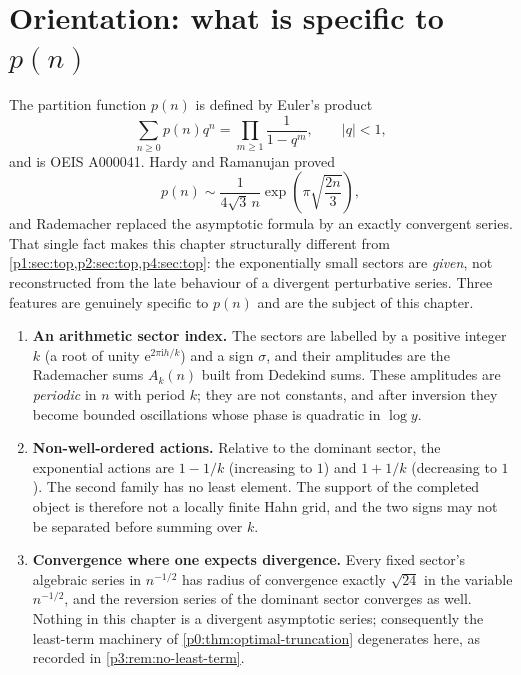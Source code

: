 \documentclass[11pt,a4paper,oneside]{book}
\theoremstyle{plain}
\theoremstyle{definition}
\theoremstyle{remark}
\newcommand{\e}{\mathrm{e}}
\newcommand{\ii}{\mathrm{i}}
\begin{document}
\section{Orientation: what is specific to \texorpdfstring{$p(n)$}{p(n)}}
\label{p3:sec:orientation}

The partition function $p(n)$ is defined by Euler's product
\begin{equation}\label{p3:eq:euler-product}
 \sum_{n\ge0}p(n)q^{n}=\prod_{m\ge1}\frac1{1-q^{m}},\qquad |q|<1 ,
\end{equation}
and is OEIS A000041. Hardy and Ramanujan proved
\begin{equation}\label{p3:eq:HR}
 p(n)\sim\frac1{4\sqrt3\,n}\exp\!\left(\pi\sqrt{\frac{2n}{3}}\right),
\end{equation}
and Rademacher replaced the asymptotic formula by an exactly convergent series. That single fact
makes this chapter structurally different from \cref{p1:sec:top,p2:sec:top,p4:sec:top}: the
exponentially small sectors are \emph{given}, not reconstructed from the late behaviour of a
divergent perturbative series. Three features are genuinely specific to $p(n)$ and are the subject
of this chapter.

\begin{enumerate}
\item \textbf{An arithmetic sector index.}  The sectors are labelled by a
positive integer $k$ (a root of unity $\e^{2\pi\ii h/k}$) and a sign $\sigma$, and their
amplitudes are the Rademacher sums $A_k(n)$ built from Dedekind sums. These amplitudes are
\emph{periodic} in $n$ with period $k$; they are not constants, and after inversion they become
bounded oscillations whose phase is quadratic in $\log y$.
\item \textbf{Non-well-ordered actions.}  Relative to the dominant sector, the
exponential actions are $1-1/k$ (increasing to $1$) and $1+1/k$ (decreasing to $1$). The second
family has no least element. The support of the completed object is therefore not a locally finite
Hahn grid, and the two signs may not be separated before summing over $k$.
\item \textbf{Convergence where one expects divergence.}  Every fixed sector's
algebraic series in $n^{-1/2}$ has radius of convergence exactly $\sqrt{24}$ in the variable
$n^{-1/2}$, and the reversion series of the dominant sector converges as well. Nothing in this
chapter is a divergent asymptotic series; consequently the least-term machinery of
\cref{p0:thm:optimal-truncation} degenerates here, as recorded in \cref{p3:rem:no-least-term}.
\end{enumerate}
\end{document}
